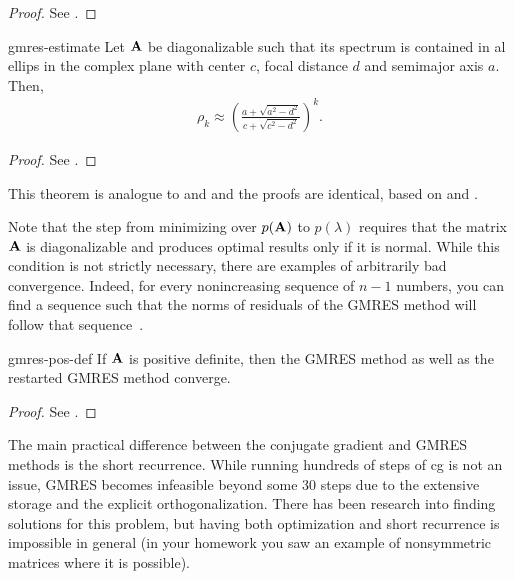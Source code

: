 \begin{proof}
  See \cite[Proposition 6.32]{Saad00}.
\end{proof}

\begin{Corollary}{gmres-estimate}
  Let $\mathbf A$ be diagonalizable such that its spectrum is contained in
  al ellips in the complex plane with center $c$, focal distance $d$
  and semimajor axis $a$. Then,
  \begin{gather}
     \rho_k \approx \left(
      \frac{a+\sqrt{a^2-d^2}}{c+\sqrt{c^2-d^2}}
      \right)^k.
  \end{gather}
\end{Corollary}

\begin{proof}
  See \cite[Corollary 6.33]{Saad00}.
\end{proof}

\begin{remark}
  This theorem is analogue to  and
   and the proofs are
  identical, based on  and
  .

  Note that the step from minimizing over $p(\mathbf A)$ to $p(\lambda)$
  requires that the matrix $\mathbf A$ is diagonalizable and produces
  optimal results only if it is normal. While this condition is not
  strictly necessary, there are examples of arbitrarily bad
  convergence. Indeed, for every nonincreasing sequence of $n-1$
  numbers, you can find a sequence such that the norms of residuals of
  the GMRES method will follow that
  sequence~\cite{GreenbaumPtakStrakos96}.
\end{remark}

\begin{Theorem}{gmres-pos-def}
  If $\mathbf A$ is positive definite, then the GMRES method as well as
  the restarted GMRES method converge.
\end{Theorem}

\begin{proof}
  See \cite[Theorem 6.30]{Saad00}.
\end{proof}

\begin{remark}
  The main practical difference between the conjugate gradient and
  GMRES methods is the short recurrence. While running hundreds of
  steps of cg is not an issue, GMRES becomes infeasible beyond some 30
  steps due to the extensive storage and the explicit
  orthogonalization. There has been research into finding solutions
  for this problem, but having both optimization and short recurrence
  is impossible in general (in your homework you saw an example of
  nonsymmetric matrices where it is possible).
\end{remark}

